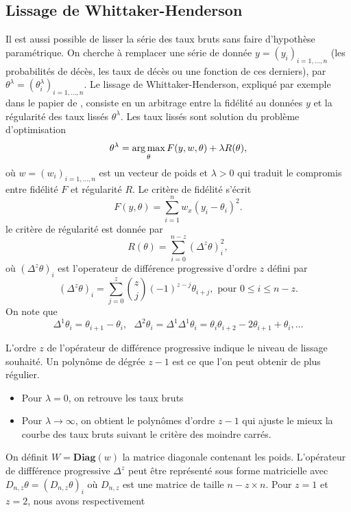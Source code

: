 \subsection{Lissage de Whittaker-Henderson}
Il est aussi possible de lisser la série des taux bruts sans faire d'hypothèse paramétrique. On cherche à remplacer une série de donnée $y = (y_i)_{i=1,\ldots, n}$ (les probabilités de décès, les taux de décès ou une fonction de ces derniers),  par $\theta^\lambda = (\theta^\lambda_i)_{i = 1,\ldots, n}$. Le lissage de Whittaker-Henderson, expliqué par exemple dans le papier de \citet{Biessy2023}, consiste en un arbitrage entre la fidélité au données $y$ et la régularité des taux lissés $\theta^\lambda$. Les taux lissés sont solution du problème d'optimisation 
$$
\theta^\lambda = \operatorname*{arg\,max}_{\theta}  F(y,w, \theta) + \lambda R(\theta),
$$
où $ w = (w_i)_{i=1,\ldots, n}$ est un vecteur de poids et $\lambda >0$ qui traduit le compromis entre fidélité $F$ et régularité $R$. Le critère de fidélité s'écrit 
$$
F(y, \theta) = \sum_{i = 1}^n w_x(y_i - \theta_i)^2.
$$
le critère de régularité est donnée par 
$$
R(\theta) = \sum_{i=0}^{n-z} (\Delta^{z}\theta)_i^2,
$$
où $(\Delta^{z}\theta)_i$ est l'operateur de différence progressive d'ordre $z$ défini par 
$$
(\Delta^{z}\theta)_i = \sum_{j=0}^z\binom{z}{j}(-1)^{z-j}\theta_{i+j}, \text{ pour }0\leq i\leq n-z. 
$$
On note que 
$$
 \Delta^{1}\theta_i = \theta_{i+1}-\theta_{i},\text{ }\Delta^{2}\theta_i =\Delta^1 \Delta^1\theta_i =\theta_i \theta_{i+2}-2\theta_{i+1}+\theta_{i},\ldots
$$
\begin{remark}
L'ordre $z$ de l'opérateur de différence progressive indique le niveau de lissage souhaité. Un polynôme de dégrée $z-1$ est ce que l'on peut obtenir de plus régulier. 
\begin{itemize}
  \item Pour $\lambda = 0$, on retrouve les taux bruts
  \item Pour $\lambda \rightarrow \infty$, on obtient le polynômes d'ordre $z-1$ qui ajuste le mieux la courbe des taux bruts suivant le critère des moindre carrés.
\end{itemize}
\end{remark}
On définit $W = \textbf{Diag}\left( w\right)$ la matrice diagonale contenant les poids. L'opérateur  de diffférence progressive $\Delta^z$ peut être représenté sous forme matricielle avec $D_{n,z}\theta = (D_{n,z}\theta)_i$ où $D_{n,z}$ est une matrice de taille $n-z\times n$. Pour $z=1$ et $z = 2$, nous avons respectivement

